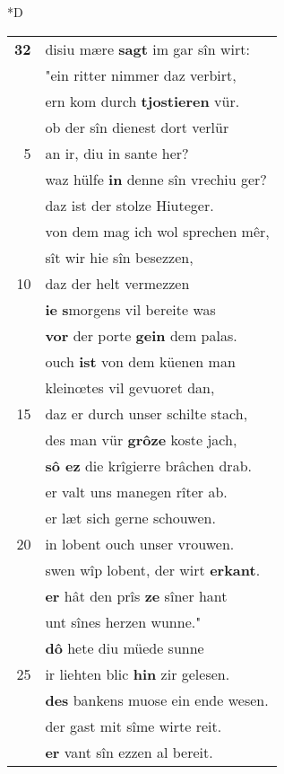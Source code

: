 \documentclass[8pt,a4paper,notitlepage]{article}
\begin{document}
\begin{table}[ht]
\begin{minipage}[t]{0.5\linewidth}
\small
\begin{center}*D
\end{center}
\begin{tabular}{rl}
\textbf{32} & disiu mære \textbf{sagt} im gar sîn wirt:\\ 
 & "ein ritter nimmer daz verbirt,\\ 
 & ern kom durch \textbf{tjostieren} vür.\\ 
 & ob der sîn dienest dort verlür\\ 
5 & an ir, diu in sante her?\\ 
 & waz hülfe \textbf{in} denne sîn vrechiu ger?\\ 
 & daz ist der stolze Hiuteger.\\ 
 & von dem mag ich wol sprechen mêr,\\ 
 & sît wir hie sîn besezzen,\\ 
10 & daz der helt vermezzen\\ 
 & \textbf{ie} \textbf{s}morgens vil bereite was\\ 
 & \textbf{vor} der porte \textbf{gein} dem palas.\\ 
 & ouch \textbf{ist} von dem küenen man\\ 
 & kleinœtes vil gevuoret dan,\\ 
15 & daz er durch unser schilte stach,\\ 
 & des man vür \textbf{grôze} koste jach,\\ 
 & \textbf{sô ez} die krîgierre brâchen drab.\\ 
 & er valt uns manegen rîter ab.\\ 
 & er læt sich gerne schouwen.\\ 
20 & in lobent ouch unser vrouwen.\\ 
 & swen wîp lobent, der wirt \textbf{erkant}.\\ 
 & \textbf{er} hât den prîs \textbf{ze} sîner hant\\ 
 & unt sînes herzen wunne."\\ 
 & \textbf{dô} hete diu müede sunne\\ 
25 & ir liehten blic \textbf{hin} zir gelesen.\\ 
 & \textbf{des} bankens muose ein ende wesen.\\ 
 & der gast mit sîme wirte reit.\\ 
 & \textbf{er} vant sîn ezzen al bereit.\\ 

\end{tabular}
\end{minipage}
\end{table}
\end{document}
